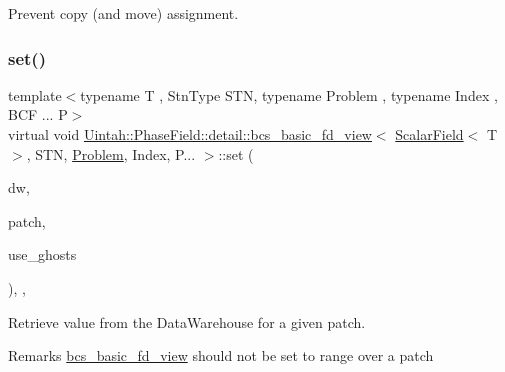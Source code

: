 Prevent copy (and move) assignment. 

\mbox{\label{classUintah_1_1PhaseField_1_1detail_1_1bcs__basic__fd__view_3_01ScalarField_3_01T_01_4_00_01STN_07caa9955adf783da0505eac75e76f08_afe8b66fd39607e8f5b5e79ae5d6e0df3}} 
\subsubsection{\texorpdfstring{set()}{set()}\hspace{0.1cm}{\footnotesize\ttfamily [1/2]}}
{\footnotesize\ttfamily template$<$typename T , Stn\+Type S\+TN, typename Problem , typename Index , B\+C\+F ... P$>$ \\
virtual void \hyperlink{classUintah_1_1PhaseField_1_1detail_1_1bcs__basic__fd__view}{Uintah\+::\+Phase\+Field\+::detail\+::bcs\+\_\+basic\+\_\+fd\+\_\+view}$<$ \hyperlink{structUintah_1_1PhaseField_1_1ScalarField}{Scalar\+Field}$<$ T $>$, S\+TN, \hyperlink{classUintah_1_1PhaseField_1_1Problem}{Problem}, Index, P... $>$\+::set (\begin{DoxyParamCaption}\item[{Data\+Warehouse $\ast$}]{dw,  }\item[{const Patch $\ast$}]{patch,  }\item[{bool}]{use\+\_\+ghosts }\end{DoxyParamCaption})\hspace{0.3cm}{\ttfamily [inline]}, {\ttfamily [override]}, {\ttfamily [virtual]}}



Retrieve value from the Data\+Warehouse for a given patch. 

\begin{DoxyRemark}{Remarks}
\hyperlink{classUintah_1_1PhaseField_1_1detail_1_1bcs__basic__fd__view}{bcs\+\_\+basic\+\_\+fd\+\_\+view} should not be set to range over a patch
\end{DoxyRemark}

